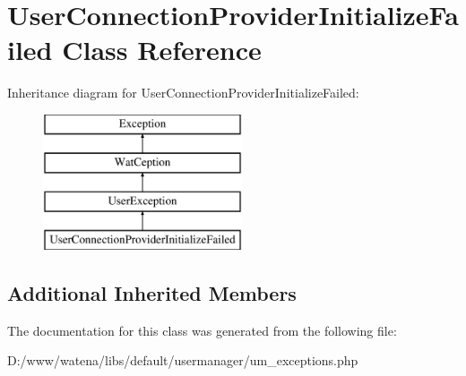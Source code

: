 \hypertarget{class_user_connection_provider_initialize_failed}{\section{User\-Connection\-Provider\-Initialize\-Failed Class Reference}
\label{class_user_connection_provider_initialize_failed}
}
Inheritance diagram for User\-Connection\-Provider\-Initialize\-Failed\-:\begin{figure}[H]
\begin{center}
\leavevmode
\includegraphics[height=4.000000cm]{class_user_connection_provider_initialize_failed}
\end{center}
\end{figure}
\subsection*{Additional Inherited Members}


The documentation for this class was generated from the following file\-:\begin{DoxyCompactItemize}
\item 
D\-:/www/watena/libs/default/usermanager/um\-\_\-exceptions.\-php\end{DoxyCompactItemize}
